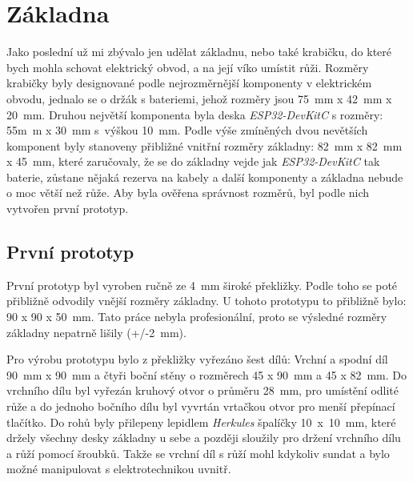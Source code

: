 \chapter{Základna}
Jako poslední už mi zbývalo jen udělat základnu, nebo také krabičku, do které bych mohla schovat elektrický obvod, a na její víko umístit růži.
Rozměry krabičky byly designované podle nejrozměrnější komponenty v elektrickém obvodu, jednalo se o držák s bateriemi, jehož rozměry jsou 75~mm x 42~mm x 20~mm. Druhou největší komponenta byla deska \textit{ESP32-DevKitC} s rozměry: 55m~m x 30~mm s~výškou 10~mm.
Podle výše zmíněných dvou nevětších komponent byly stanoveny přibližné vnitřní rozměry základny: 82~mm x 82~mm x 45~mm, které zaručovaly, že se do základny vejde jak \textit{ESP32-DevKitC} tak baterie, zůstane nějaká rezerva na kabely a další komponenty a základna nebude o moc větší než růže.  
Aby byla ověřena správnost rozměrů, byl podle nich vytvořen první prototyp.



\section{První prototyp}
První prototyp byl vyroben ručně ze 4~mm široké překližky. Podle toho se poté přibližně odvodily vnější rozměry základny. U tohoto prototypu to přibližně bylo: 90 x 90 x 50~mm. Tato práce nebyla profesionální, proto se výsledné rozměry základny nepatrně lišily (+/-2~mm).

Pro výrobu prototypu bylo z překližky vyřezáno šest dílů: Vrchní a spodní díl 90~mm x 90~mm a čtyři boční stěny o rozměrech 45 x 90~mm a 45 x 82~mm. Do vrchního dílu byl vyřezán kruhový otvor o průměru 28~mm, pro umístění odlité růže a do jednoho bočního dílu byl vyvrtán vrtačkou otvor pro menší přepínací tlačítko. Do rohů byly přilepeny lepidlem \textit{Herkules} špalíčky 10~x~10~mm, které držely všechny desky základny u sebe a později sloužily pro držení vrchního dílu a růží pomocí šroubků. Takže se vrchní díl s růží mohl kdykoliv sundat a bylo možné manipulovat s elektrotechnikou uvnitř.

